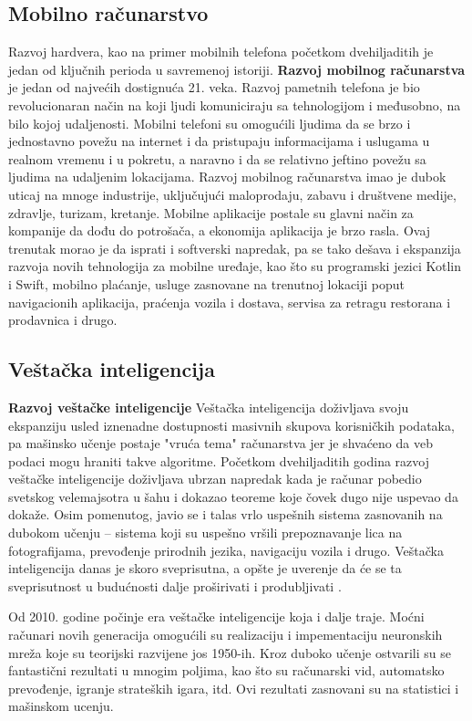 \documentclass[a4paper]{article}
\begin{document}
{\subsection{Mobilno računarstvo}
Razvoj hardvera, kao na primer mobilnih telefona početkom dvehiljaditih je jedan od ključnih perioda u savremenoj istoriji.
{\bf Razvoj mobilnog računarstva} je jedan od najvećih dostignuća 21. veka. Razvoj pametnih telefona je bio revolucionaran način na koji ljudi komuniciraju sa tehnologijom i međusobno, na bilo kojoj udaljenosti.  Mobilni telefoni su omogućili ljudima da se brzo i jednostavno povežu na internet i da pristupaju informacijama i uslugama u realnom vremenu i u pokretu, a naravno i da se relativno jeftino povežu sa ljudima na udaljenim lokacijama. 
Razvoj mobilnog računarstva imao je dubok uticaj na mnoge industrije, uključujući maloprodaju, zabavu i društvene medije, zdravlje, turizam, kretanje. Mobilne aplikacije postale su glavni način za kompanije da dođu do potrošača, a ekonomija aplikacija je brzo rasla.
Ovaj trenutak morao je da isprati i softverski napredak, pa se tako dešava i ekspanzija razvoja novih tehnologija za mobilne uređaje, kao što su programski jezici Kotlin i Swift, mobilno plaćanje, usluge zasnovane na trenutnoj lokaciji poput navigacionih aplikacija, praćenja vozila i dostava, servisa za retragu restorana i prodavnica i drugo. 

\subsection{Veštačka inteligencija}
{\bf Razvoj veštačke inteligencije}
Veštačka inteligencija doživljava svoju ekspanziju usled iznenadne dostupnosti masivnih skupova korisničkih podataka, pa mašinsko učenje postaje "vruća tema" računarstva
jer je shvaćeno da veb podaci mogu hraniti takve algoritme. Početkom dvehiljaditih godina razvoj veštačke inteligencije doživljava ubrzan napredak kada je računar pobedio svetskog velemajsotra u šahu i dokazao teoreme koje čovek dugo nije uspevao da dokaže. 
Osim pomenutog, javio se i talas vrlo uspešnih sistema zasnovanih na \„dubokom učenju\“ – sistema koji su uspešno vršili prepoznavanje lica na fotografijama, prevođenje prirodnih jezika, navigaciju vozila i drugo. Veštačka inteligencija danas je skoro sveprisutna, a opšte je uverenje da će se ta sveprisutnost u budućnosti dalje proširivati i produbljivati \cite{vi}.

Od 2010. godine počinje era veštačke inteligencije koja i dalje traje. Moćni računari novih generacija omogućili su realizaciju i impementaciju neuronskih mreža koje su teorijski razvijene jos 1950-ih.
Kroz duboko učenje ostvarili su se fantastični rezultati u mnogim poljima, kao što su računarski vid, automatsko prevođenje, igranje strateških igara, itd. Ovi rezultati zasnovani su na statistici i mašinskom ucenju.

}
\end{document}
